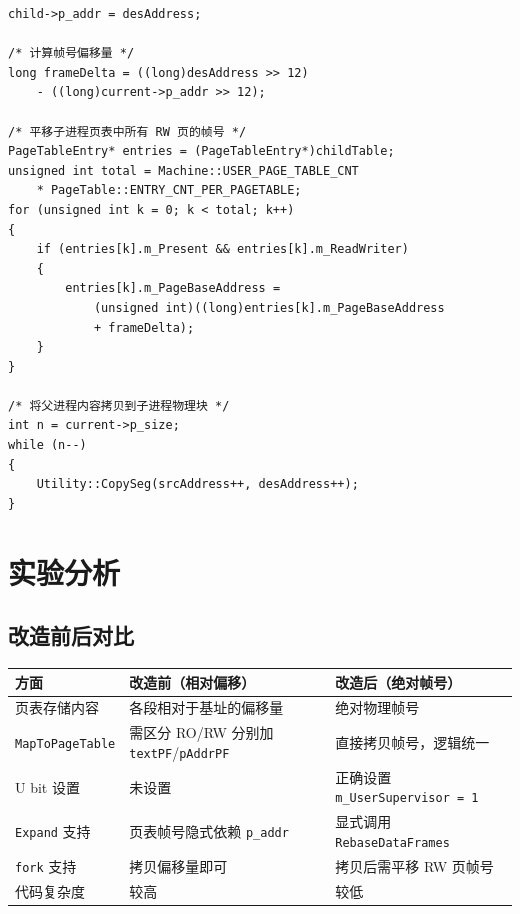 \documentclass[12pt]{article}
\begin{document}
\begin{lstlisting}[caption={NewProc 中的离散化 fork}]
child->p_addr = desAddress;

/* 计算帧号偏移量 */
long frameDelta = ((long)desAddress >> 12)
    - ((long)current->p_addr >> 12);

/* 平移子进程页表中所有 RW 页的帧号 */
PageTableEntry* entries = (PageTableEntry*)childTable;
unsigned int total = Machine::USER_PAGE_TABLE_CNT
    * PageTable::ENTRY_CNT_PER_PAGETABLE;
for (unsigned int k = 0; k < total; k++)
{
    if (entries[k].m_Present && entries[k].m_ReadWriter)
    {
        entries[k].m_PageBaseAddress =
            (unsigned int)((long)entries[k].m_PageBaseAddress
            + frameDelta);
    }
}

/* 将父进程内容拷贝到子进程物理块 */
int n = current->p_size;
while (n--)
{
    Utility::CopySeg(srcAddress++, desAddress++);
}
\end{lstlisting}

\section{实验分析}

\subsection{改造前后对比}

\begin{table}[H]
\centering
\begin{tabular}{p{3cm}p{5cm}p{5cm}}
\toprule
\textbf{方面} & \textbf{改造前（相对偏移）} & \textbf{改造后（绝对帧号）} \\
\midrule
页表存储内容 & 各段相对于基址的偏移量 & 绝对物理帧号 \\
\texttt{MapToPageTable} & 需区分 RO/RW 分别加 \texttt{textPF}/\texttt{pAddrPF} & 直接拷贝帧号，逻辑统一 \\
U bit 设置 & 未设置 & 正确设置 \texttt{m\_UserSupervisor = 1} \\
\texttt{Expand} 支持 & 页表帧号隐式依赖 \texttt{p\_addr} & 显式调用 \texttt{RebaseDataFrames} \\
\texttt{fork} 支持 & 拷贝偏移量即可 & 拷贝后需平移 RW 页帧号 \\
代码复杂度 & 较高 & 较低 \\
\bottomrule
\end{tabular}
\end{table}
\end{document}
